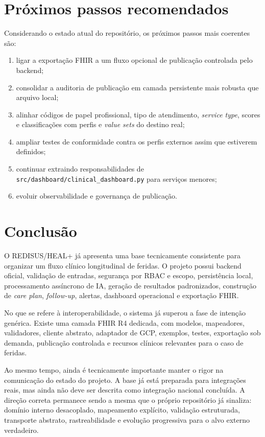\documentclass[
    12pt,
    openright,
    oneside,
    a4paper,
    chapter=TITLE,
    section=TITLE,
    brazil,
    sumario=tradicional,
    hidelinks
]{abntex2}
\begin{document}
\chapter{Pr\'oximos passos recomendados}

Considerando o estado atual do reposit\'orio, os pr\'oximos passos mais coerentes s\~ao:

\begin{enumerate}
    \item ligar a exporta\c{c}\~ao FHIR a um fluxo opcional de publica\c{c}\~ao controlada pelo backend;
    \item consolidar a auditoria de publica\c{c}\~ao em camada persistente mais robusta que arquivo local;
    \item alinhar c\'odigos de papel profissional, tipo de atendimento, \textit{service type}, scores e classifica\c{c}\~oes com perfis e \textit{value sets} do destino real;
    \item ampliar testes de conformidade contra os perfis externos assim que estiverem definidos;
    \item continuar extraindo responsabilidades de \texttt{src/dashboard/clinical\_dashboard.py} para servi\c{c}os menores;
    \item evoluir observabilidade e governan\c{c}a de publica\c{c}\~ao.
\end{enumerate}

\chapter{Conclus\~ao}

O REDISUS/HEAL+ j\'a apresenta uma base tecnicamente consistente para organizar um fluxo cl\'inico longitudinal de feridas. O projeto possui backend oficial, valida\c{c}\~ao de entradas, seguran\c{c}a por RBAC e escopo, persist\^encia local, processamento ass\'incrono de IA, gera\c{c}\~ao de resultados padronizados, constru\c{c}\~ao de \textit{care plan}, \textit{follow-up}, alertas, dashboard operacional e exporta\c{c}\~ao FHIR.

No que se refere \`a interoperabilidade, o sistema j\'a superou a fase de inten\c{c}\~ao gen\'erica. Existe uma camada FHIR R4 dedicada, com modelos, mapeadores, validadores, cliente abstrato, adaptador de GCP, exemplos, testes, exporta\c{c}\~ao sob demanda, publica\c{c}\~ao controlada e recursos cl\'inicos relevantes para o caso de feridas.

Ao mesmo tempo, ainda \'e tecnicamente importante manter o rigor na comunica\c{c}\~ao do estado do projeto. A base j\'a est\'a preparada para integra\c{c}\~oes reais, mas ainda n\~ao deve ser descrita como integra\c{c}\~ao nacional conclu\'ida. A dire\c{c}\~ao correta permanece sendo a mesma que o pr\'oprio reposit\'orio j\'a sinaliza: dom\'inio interno desacoplado, mapeamento expl\'icito, valida\c{c}\~ao estruturada, transporte abstrato, rastreabilidade e evolu\c{c}\~ao progressiva para o alvo externo verdadeiro.
\end{document}
